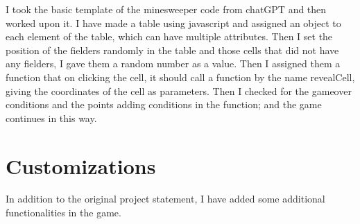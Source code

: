 \documentclass{article}
\begin{document}
I took the basic template of the minesweeper code from chatGPT and then worked upon it. I have made a table using javascript and assigned an object to each element of the table, which can have multiple attributes. Then I set the position of the fielders randomly in the table and those cells that did not have any fielders, I gave them a random number as a value. Then I assigned them a function that on clicking the cell, it should call a function by the name revealCell, giving the coordinates of the cell as parameters. Then I checked for the gameover conditions and the points adding conditions in the function; and the game continues in this way.

\section*{Customizations}

In addition to the original project statement, I have added some additional functionalities in the game.
\end{document}
